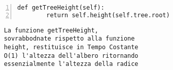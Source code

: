 \begin{minipage}{0.49\linewidth}
	\begin{Verbatim}[frame=topline,numbers=left,label=Codice,framesep=3mm]
	def getTreeHeight(self):
	    return self.height(self.tree.root)
	\end{Verbatim}
\end{minipage}\hfill
\begin{minipage}{0.8\linewidth}
	\begin{Verbatim}
	La funzione getTreeHeight, 
	sovrabbodnate rispetto alla funzione
	height, restituisce in Tempo Costante
	O(1) l'altezza dell'albero ritornando
	essenzialmente l'altezza della radice
	\end{Verbatim}
\end{minipage}